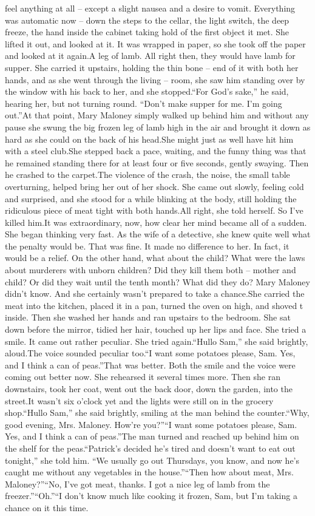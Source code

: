 \documentclass[11pt,a4paper]{article}
\begin{document}
{feel anything at all – except a slight nausea and a desire to vomit. Everything was automatic now – down the steps to the cellar, the light switch, the deep freeze, the hand inside the cabinet taking hold of the first object it met. She lifted it out, and looked at it. It was wrapped in paper, so she took off the paper and looked at it again.A leg of lamb. All right then, they would have lamb for supper. She carried it upstairs, holding the thin bone – end of it with both her hands, and as she went through the living – room, she saw him standing over by the window with his back to her, and she stopped.“For God’s sake,” he said, hearing her, but not turning round. “Don’t make supper for me. I’m going out.”At that point, Mary Maloney simply walked up behind him and without any pause she swung the big frozen leg of lamb high in the air and brought it down as hard as she could on the back of his head.She might just as well have hit him with a steel club.She stepped back a pace, waiting, and the funny thing was that he remained standing there for at least four or five seconds, gently swaying. Then he crashed to the carpet.The violence of the crash, the noise, the small table overturning, helped bring her out of her shock. She came out slowly, feeling cold and surprised, and she stood for a while blinking at the body, still holding the ridiculous piece of meat tight with both hands.All right, she told herself. So I’ve killed him.It was extraordinary, now, how clear her mind became all of a sudden. She began thinking very fast. As the wife of a detective, she knew quite well what the penalty would be. That was fine. It made no difference to her. In fact, it would be a relief. On the other hand, what about the child? What were the laws about murderers with unborn children? Did they kill them both – mother and child? Or did they wait until the tenth month? What did they do? Mary Maloney didn’t know. And she certainly wasn’t prepared to take a chance.She carried the meat into the kitchen, placed it in a pan, turned the oven on high, and shoved t inside. Then she washed her hands and ran upstairs to the bedroom. She sat down before the mirror, tidied her hair, touched up her lips and face. She tried a smile. It came out rather peculiar. She tried again.“Hullo Sam,” she said brightly, aloud.The voice sounded peculiar too.“I want some potatoes please, Sam. Yes, and I think a can of peas.”That was better. Both the smile and the voice were coming out better now. She rehearsed it several times more. Then she ran downstairs, took her coat, went out the back door, down the garden, into the street.It wasn’t six o’clock yet and the lights were still on in the grocery shop.“Hullo Sam,” she said brightly, smiling at the man behind the counter.“Why, good evening, Mrs. Maloney. How’re you?”“I want some potatoes please, Sam. Yes, and I think a can of peas.”The man turned and reached up behind him on the shelf for the peas.“Patrick’s decided he’s tired and doesn’t want to eat out tonight,” she told him. “We usually go out Thursdays, you know, and now he’s caught me without any vegetables in the house.”“Then how about meat, Mrs. Maloney?”“No, I’ve got meat, thanks. I got a nice leg of lamb from the freezer.”“Oh.”“I don’t know much like cooking it frozen, Sam, but I’m taking a chance on it this time. }
\end{document}
